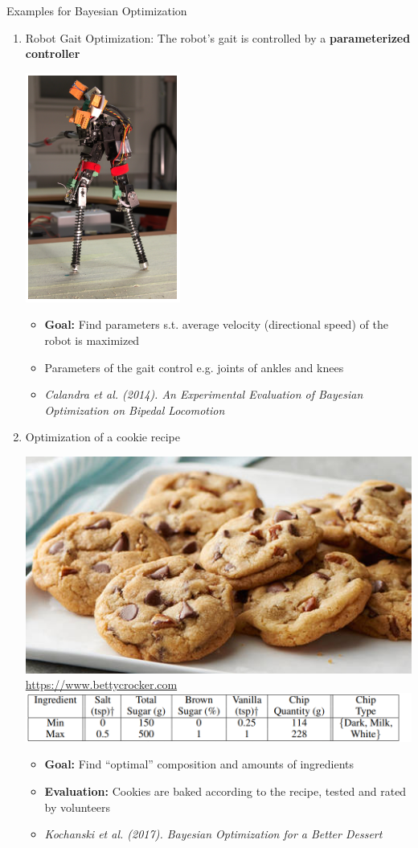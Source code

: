\documentclass[11pt,compress,t,notes=noshow, xcolor=table]{beamer}
\begin{document}
\begin{vbframe}{Examples for Bayesian Optimization} 
\begin{enumerate}
\item Robot Gait Optimization: The robot's gait is controlled by a \textbf{parameterized controller}

\medskip

\begin{center}
\includegraphics[width = 2.5 cm]{figure_man/robot_gait.png}\\
\end{center}
\begin{footnotesize}
\begin{itemize}
\item \textbf{Goal: } Find parameters s.t. average velocity (directional speed) of the robot is maximized
\item Parameters of the gait control e.g. joints of ankles and knees
\item \emph{Calandra et al. (2014). An Experimental Evaluation of Bayesian Optimization on Bipedal Locomotion}
\end{itemize}
\end{footnotesize}

\framebreak 

\item Optimization of a cookie recipe
\medskip

\begin{center}
\includegraphics[width = 5 cm]{figure_man/cookie.jpg}\\
\tiny{\url{https://www.bettycrocker.com}} \\
\includegraphics[width = 8 cm]{figure_man/cookie2.png}
\end{center}
\begin{itemize}
\item \textbf{Goal: } Find \enquote{optimal} composition and amounts of ingredients 
\item \textbf{Evaluation: } Cookies are baked according to the recipe, tested and rated by volunteers
\item \emph{Kochanski et al. (2017). Bayesian Optimization for a Better Dessert}
\end{itemize}

\end{enumerate}
\end{vbframe}
\end{document}
